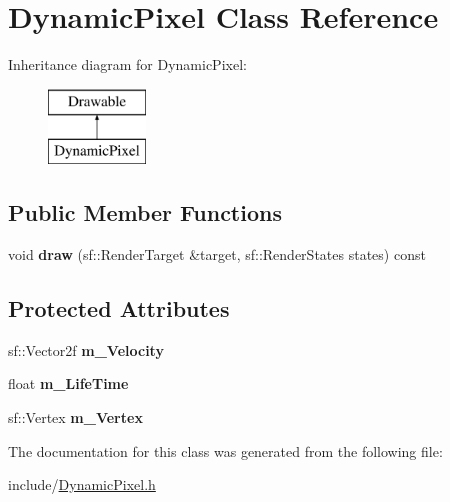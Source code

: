 \hypertarget{class_dynamic_pixel}{}\section{Dynamic\+Pixel Class Reference}
\label{class_dynamic_pixel}
Inheritance diagram for Dynamic\+Pixel\+:\begin{figure}[H]
\begin{center}
\leavevmode
\includegraphics[height=2.000000cm]{class_dynamic_pixel}
\end{center}
\end{figure}
\subsection*{Public Member Functions}
\begin{DoxyCompactItemize}
\item 
\mbox{\label{class_dynamic_pixel_a67e9d3edba68ecf4072be4a7e074f15d}} 
void {\bfseries draw} (sf\+::\+Render\+Target \&target, sf\+::\+Render\+States states) const
\end{DoxyCompactItemize}
\subsection*{Protected Attributes}
\begin{DoxyCompactItemize}
\item 
\mbox{\label{class_dynamic_pixel_aca813100b6b0eb003c28fab84f51a0df}} 
sf\+::\+Vector2f {\bfseries m\+\_\+\+Velocity}
\item 
\mbox{\label{class_dynamic_pixel_a428e452a17c872985594b80ecae06d80}} 
float {\bfseries m\+\_\+\+Life\+Time}
\item 
\mbox{\label{class_dynamic_pixel_aae21ebb04116b84913e87cf5310c8b23}} 
sf\+::\+Vertex {\bfseries m\+\_\+\+Vertex}
\end{DoxyCompactItemize}


The documentation for this class was generated from the following file\+:\begin{DoxyCompactItemize}
\item 
include/\hyperlink{_dynamic_pixel_8h}{Dynamic\+Pixel.\+h}\end{DoxyCompactItemize}
